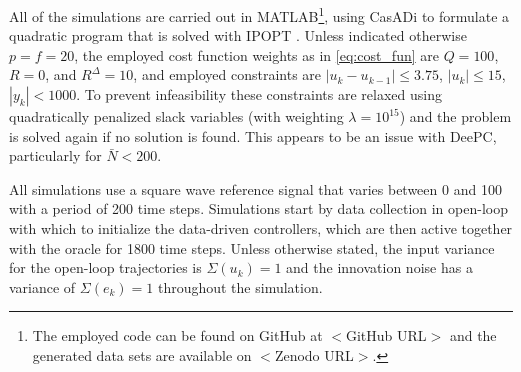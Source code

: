 All of the simulations are carried out in MATLAB\footnote{The employed code can be found on GitHub at $<$GitHub URL$>$ and the generated data sets are available on $<$Zenodo URL$>$.}, using CasADi \citep{Andersson2019} to formulate a quadratic program that is solved with IPOPT \citep{Wachter2006}. Unless indicated otherwise $p=f=20$, the employed cost function weights as in \eqref{eq:cost_fun} are $Q=100$, $R=0$, and $R^\Delta=10$, and employed constraints are $|u_k-u_{k-1}|\leq3.75$, $|u_k|\leq15$, $|y_k|<1000$. To prevent infeasibility these constraints are relaxed using quadratically penalized slack variables (with weighting $\lambda=10^{15}$) and the problem is solved again if no solution is found. This appears to be an issue with \ac{DeePC}, particularly for $\bar{N}<200$.

All simulations use a square wave reference signal that varies between 0 and 100 with a period of 200 time steps. Simulations start by data collection in open-loop with which to initialize the data-driven controllers, which are then active together with the oracle for 1800 time steps. Unless otherwise stated, the input variance for the open-loop trajectories is $\Sigma(u_k)=1$ and the innovation noise has a variance of $\Sigma(e_k)=1$ throughout the simulation.